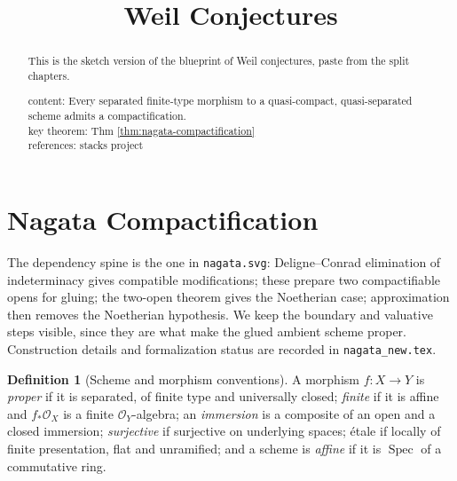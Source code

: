 \documentclass[11pt]{article}
\title{Weil Conjectures}
\date{}
\makeatletter
\theoremstyle{plain}
\theoremstyle{definition}
\newtheorem{definition}[theorem]{Definition}
\DeclareMathOperator{\Spec}{Spec}
\newcommand{\up}[1]{%
  \ifcsname r@#1\endcsname
    \hyperref[#1]{\texttt{\scriptsize #1}}%
  \else
    \texttt{\scriptsize #1}%
  \fi}
\makeatother
\begin{document}
\maketitle

\begin{abstract}
This is the sketch version of the blueprint of Weil conjectures, paste from the split chapters.

\end{abstract}
\tableofcontents
\begingroup
\setlength{\emergencystretch}{3em}
\newcommand{\SIm}{\operatorname{SIm}}
\newcommand{\Bl}{\operatorname{Bl}}
\renewcommand{\up}[1]{%
  \ifcsname r@#1\endcsname
    \hyperref[#1]{\textnormal{\scriptsize\nolinkurl{#1}}}%
  \else
    \textnormal{\scriptsize\nolinkurl{#1}}%
  \fi}
\section{Nagata Compactification}
\label{sec:nagata-compactification}
\begin{abstract}
content: Every separated finite-type morphism to a quasi-compact,
quasi-separated scheme admits a compactification.
\\key theorem: Thm \ref{thm:nagata-compactification}
\\references: stacks project
\end{abstract}

The dependency spine is the one in \nolinkurl{nagata.svg}: Deligne--Conrad
elimination of indeterminacy gives compatible modifications; these prepare
two compactifiable opens for gluing; the two-open theorem gives the
Noetherian case; approximation then removes the Noetherian hypothesis.
We keep the boundary and valuative steps visible, since they are what make
the glued ambient scheme proper.  Construction details and formalization status are recorded in
\texttt{nagata\_new.tex}.

\begin{definition}[Scheme and morphism conventions]
	\label{def:conv}
	A morphism $f:X\to Y$ is \emph{proper} if it is separated, of finite
	type and universally closed; \emph{finite} if it is affine and
	$f_*\mathcal O_X$ is a finite $\mathcal O_Y$-algebra; an
	\emph{immersion} is a composite of an open and a closed immersion;
	\emph{surjective} if surjective on underlying spaces; \'etale if
	locally of finite presentation, flat and unramified; and a scheme is
	\emph{affine} if it is $\Spec$ of a commutative ring.
\end{definition}
\end{document}
